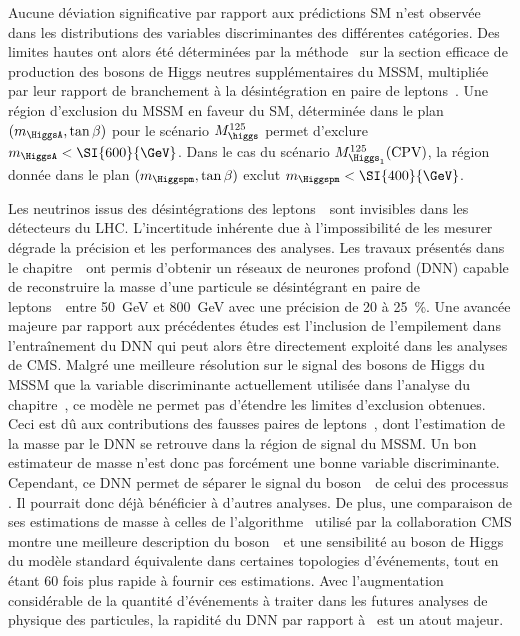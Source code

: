 Aucune déviation significative par rapport aux prédictions SM n'est observée
dans
les distributions des variables discriminantes des différentes catégories.
Des limites hautes ont alors été déterminées par la méthode \CLS\ sur la section efficace de production des bosons de Higgs neutres supplémentaires du MSSM, multipliée par leur rapport de branchement à la désintégration en paire de leptons~\tau.
Une région d'exclusion du MSSM en faveur du SM,
déterminée dans le plan $(m_{\HiggsA},\tan\beta)$ pour le scénario $M_{\higgs}^{125}$
permet d'exclure
$m_{\HiggsA} < \SI{600}{\GeV}$.
Dans le cas du scénario $M_{\Higgs_1}^{125}(\text{CPV})$,
la région donnée dans le plan $(m_{\Higgspm},\tan\beta)$
exclut
$m_{\Higgspm} < \SI{400}{\GeV}$.
\par
Les neutrinos issus des désintégrations des leptons~\tau\
sont invisibles dans les détecteurs du LHC.
L'incertitude inhérente due à l'impossibilité de les mesurer
dégrade la précision et les performances des analyses.
Les travaux présentés dans le chapitre~\
ont permis d'obtenir un réseaux de neurones profond (DNN)
capable de reconstruire la masse d'une particule se désintégrant en paire de leptons~\tau\
entre \SI{50}{\GeV} et \SI{800}{\GeV}
avec une précision de \num{20} à \SI{25}{\%}.
Une avancée majeure par rapport aux précédentes études est l'inclusion de l'empilement dans l'entraînement du DNN
qui peut alors être directement exploité dans les analyses de CMS.
Malgré une meilleure résolution sur le signal des bosons de Higgs du MSSM que la variable discriminante actuellement utilisée dans l'analyse du chapitre~,
ce modèle ne permet pas d'étendre les limites d'exclusion obtenues.
Ceci est dû aux contributions des fausses paires de leptons~\tau,
dont l'estimation de la masse par le DNN se retrouve dans la région de signal du MSSM.
Un bon estimateur de masse n'est donc pas forcément une bonne variable discriminante.
Cependant,
ce DNN permet de séparer le signal du boson~\Zboson\ de celui des processus \ttbar.
Il pourrait donc déjà bénéficier à d'autres analyses.
De plus,
une comparaison de ses estimations de masse à celles de l'algorithme \SVFIT\ utilisé par la collaboration CMS montre
une meilleure description du boson~\Zboson\ et une sensibilité au boson de Higgs du modèle standard
équivalente
dans certaines topologies d'événements,
tout en étant 60 fois plus rapide à fournir ces estimations.
Avec l'augmentation considérable de la quantité d'événements à traiter
dans les futures analyses de physique des particules,
la rapidité du DNN par rapport à \SVFIT\
est un atout majeur.
